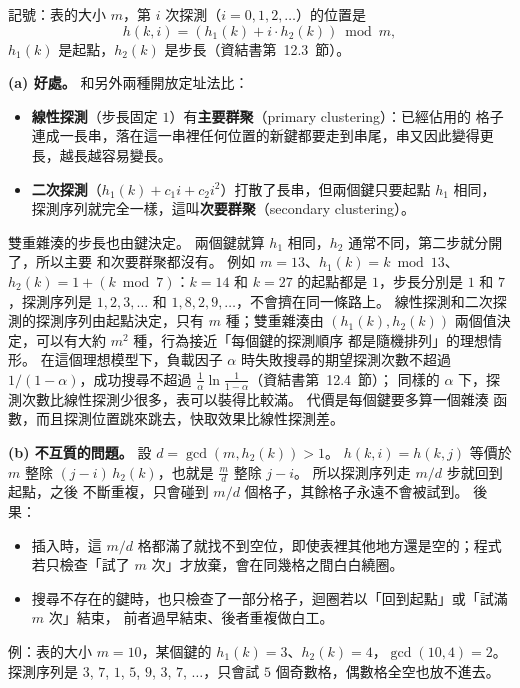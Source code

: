 \begin{pastsoln}
記號：表的大小 $m$，第 $i$ 次探測（$i = 0, 1, 2, \ldots$）的位置是
\[
h(k, i) = (h_1(k) + i \cdot h_2(k)) \bmod m ,
\]
$h_1(k)$ 是起點，$h_2(k)$ 是步長（資結書第~12.3~節）。

\textbf{(a) 好處。} 和另外兩種開放定址法比：
\begin{itemize}
\item \textbf{線性探測}（步長固定 $1$）有\textbf{主要群聚}（primary clustering）：已經佔用的
格子連成一長串，落在這一串裡任何位置的新鍵都要走到串尾，串又因此變得更長，越長越容易變長。
\item \textbf{二次探測}（$h_1(k) + c_1 i + c_2 i^2$）打散了長串，但兩個鍵只要起點 $h_1$ 相同，
探測序列就完全一樣，這叫\textbf{次要群聚}（secondary clustering）。
\end{itemize}
雙重雜湊的步長也由鍵決定。 兩個鍵就算 $h_1$ 相同，$h_2$ 通常不同，第二步就分開了，所以主要
和次要群聚都沒有。 例如 $m = 13$、$h_1(k) = k \bmod 13$、$h_2(k) = 1 + (k \bmod 7)$：$k = 14$
和 $k = 27$ 的起點都是 $1$，步長分別是 $1$ 和 $7$，探測序列是 $1, 2, 3, \ldots$ 和
$1, 8, 2, 9, \ldots$，不會擠在同一條路上。 線性探測和二次探測的探測序列由起點決定，只有 $m$
種；雙重雜湊由 $(h_1(k), h_2(k))$ 兩個值決定，可以有大約 $m^2$ 種，行為接近「每個鍵的探測順序
都是隨機排列」的理想情形。 在這個理想模型下，負載因子 $\alpha$ 時失敗搜尋的期望探測次數不超過
$1/(1 - \alpha)$，成功搜尋不超過 $\frac{1}{\alpha}\ln\frac{1}{1 - \alpha}$（資結書第~12.4~節）；
同樣的 $\alpha$ 下，探測次數比線性探測少很多，表可以裝得比較滿。 代價是每個鍵要多算一個雜湊
函數，而且探測位置跳來跳去，快取效果比線性探測差。

\textbf{(b) 不互質的問題。} 設 $d = \gcd(m, h_2(k)) > 1$。 $h(k, i) = h(k, j)$ 等價於 $m$ 整除
$(j - i)\,h_2(k)$，也就是 $\frac{m}{d}$ 整除 $j - i$。 所以探測序列走 $m/d$ 步就回到起點，之後
不斷重複，只會碰到 $m/d$ 個格子，其餘格子永遠不會被試到。 後果：
\begin{itemize}
\item 插入時，這 $m/d$ 格都滿了就找不到空位，即使表裡其他地方還是空的；程式若只檢查「試了
$m$ 次」才放棄，會在同幾格之間白白繞圈。
\item 搜尋不存在的鍵時，也只檢查了一部分格子，迴圈若以「回到起點」或「試滿 $m$ 次」結束，
前者過早結束、後者重複做白工。
\end{itemize}
例：表的大小 $m = 10$，某個鍵的 $h_1(k) = 3$、$h_2(k) = 4$，$\gcd(10, 4) = 2$。 探測序列是
$3$, $7$, $1$, $5$, $9$, $3$, $7$, $\ldots$，只會試 $5$ 個奇數格，偶數格全空也放不進去。


\end{pastsoln}
